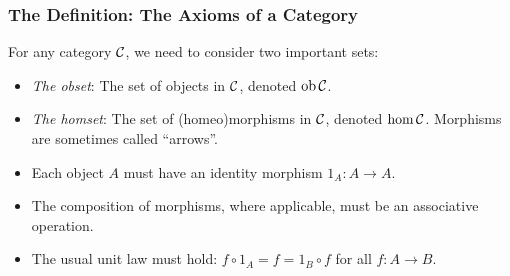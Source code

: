 \documentclass{beamer}
\numberwithin{figure}{section}
\begin{document}
\begin{frame}
        \frametitle{The Definition: The Axioms of a Category}
        For any category $\mathcal{C}$, we need to consider two important sets:
        \begin{itemize}
                \item \emph{The obset}: The set of objects in $\mathcal{C}$,
                        denoted $\operatorname{ob}{\mathcal{C}}$.
                \item \emph{The homset}: The set of (homeo)morphisms in
                        $\mathcal{C}$, denoted $\operatorname{hom}{\mathcal{C}}$. Morphisms
                        are sometimes called ``arrows''.
        \end{itemize}
        \begin{itemize}
                \item Each object $A$ must have an identity morphism $1_A \colon
                        A \to A$.
                \item The composition of morphisms, where applicable, must be an
                        associative operation.
                \item The usual unit law must hold: $f \circ 1_A = f = 1_B \circ
                        f$ for all $f \colon A \to B$.
        \end{itemize}
\end{frame}
\end{document}
